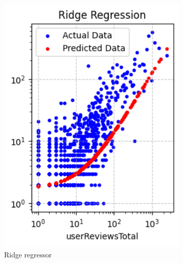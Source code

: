 \begin{figure}[H]
\begin{subfigure}{0.24\textwidth}
        \includegraphics[width=1\textwidth]{plots/ridge.png}
        \caption{Ridge regressor}
        \captionsetup{width=0.9\linewidth, justification=centering}
        \label{fig:ridge}
    \end{subfigure}
    \begin{subfigure}{0.24\textwidth}
        \centering

\end{subfigure}
\end{figure}
